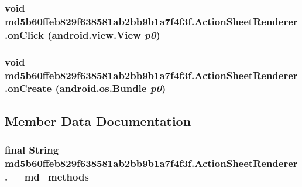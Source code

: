 \hypertarget{classmd5b60ffeb829f638581ab2bb9b1a7f4f3f_1_1_action_sheet_renderer_5df38c7adc6079f99eaf47b19cbb7974}{
\subsubsection[{onClick}]{\setlength{\rightskip}{0pt plus 5cm}void md5b60ffeb829f638581ab2bb9b1a7f4f3f.ActionSheetRenderer.onClick (android.view.View {\em p0})}}
\label{classmd5b60ffeb829f638581ab2bb9b1a7f4f3f_1_1_action_sheet_renderer_5df38c7adc6079f99eaf47b19cbb7974}


\hypertarget{classmd5b60ffeb829f638581ab2bb9b1a7f4f3f_1_1_action_sheet_renderer_4bcaeebda1585db4eb18c4353482bf5e}{
\subsubsection[{onCreate}]{\setlength{\rightskip}{0pt plus 5cm}void md5b60ffeb829f638581ab2bb9b1a7f4f3f.ActionSheetRenderer.onCreate (android.os.Bundle {\em p0})}}
\label{classmd5b60ffeb829f638581ab2bb9b1a7f4f3f_1_1_action_sheet_renderer_4bcaeebda1585db4eb18c4353482bf5e}




\subsection{Member Data Documentation}
\hypertarget{classmd5b60ffeb829f638581ab2bb9b1a7f4f3f_1_1_action_sheet_renderer_ba5845659bc7d9990f99b9029736fd0b}{
\subsubsection[{\_\-\_\-md\_\-methods}]{\setlength{\rightskip}{0pt plus 5cm}final String {\bf md5b60ffeb829f638581ab2bb9b1a7f4f3f.ActionSheetRenderer.\_\-\_\-md\_\-methods}}}
\label{classmd5b60ffeb829f638581ab2bb9b1a7f4f3f_1_1_action_sheet_renderer_ba5845659bc7d9990f99b9029736fd0b}


